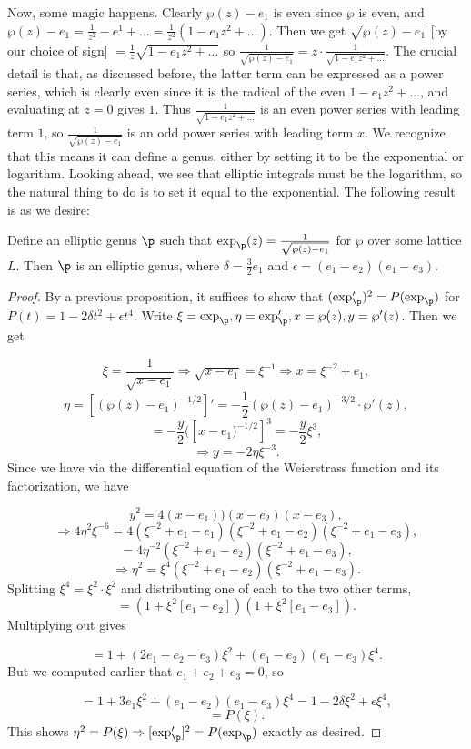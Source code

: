 Now, some magic happens. Clearly $\wp(z) - e_1$ is even since $\wp$ is even, and $\wp(z) - e_1 = \frac{1}{z^2} - e^1 + \dots = \frac{1}{z^2} (1 - e_1 z^2 + \dots)$. Then we get $\sqrt{\wp(z) - e_1}$ [by our choice of sign] $= \frac{1}{z} \sqrt{1 - e_1 z^2 + \dots}$ so $\frac{1}{\sqrt{\wp(z) - e_1}} = z \cdot \frac{1}{\sqrt{1 - e_1 z^2 + \dots}}$.  The crucial detail is that, as discussed before, the latter term can be expressed as a power series, which is clearly even since it is the radical of the even $1 - e_1 z^2 + \dots$, and evaluating at $z = 0$ gives $1$. Thus $\frac{1}{\sqrt{1 - e_1 z^2 + \dots}}$ is an even power series with leading term $1$, so  $\frac{1}{\sqrt{\wp(z) - e_1}}$ is an odd power series with leading term $x$. We recognize that this means it can define a genus, either by setting it to be the exponential or logarithm. Looking ahead, we see that elliptic integrals must be the logarithm, so the natural thing to do is to set it equal to the exponential. The following result is as we desire:

\begin{theorem}
    Define an elliptic genus $\p$ such that $\exp_\p(z) = \frac{1}{\sqrt{\wp(z) - e_1}} $ for $\wp$ over some lattice $L$. Then $\p$ is an elliptic genus, where $\delta = \frac{3}{2} e_1$ and $\epsilon = (e_1 - e_2) (e_1 - e_3)$.
\end{theorem}

\begin{proof}
    By a previous proposition, it suffices to show that $(\exp_\p ')^2 = P(\exp_\p)$ for $P(t) = 1 - 2 \delta t^2 + \epsilon t^4 $. Write $\xi  = \exp_\p, \eta = \exp_\p', x = \wp(z), y = \wp'(z)$. Then we get


\[ \xi = \frac{1}{\sqrt{x - e_1}} \Rightarrow \sqrt{x - e_1} =  \xi^{-1} \Rightarrow x = \xi^{-2} + e_1, \]
\[\eta = [(\wp(z) - e_1)^{-1/2}]' =  -\frac{1}{2} (\wp(z) - e_1)^{-3/2} \cdot \wp'(z),\]
\[  = -\frac{y}{2} ([x-e_1)^{-1/2}]^3 = - \frac{y}{2} \xi^3,\]
\[\Rightarrow y = -2 \eta \xi^{-3}.\]
Since we have via the differential equation of the Weierstrass function and its factorization, we have

\[y^2 = 4(x - e_1))(x - e_2)(x - e_3),\]
\[ \Rightarrow 4 \eta^2 \xi^{-6} = 4 (\xi^{-2} + e_1 - e_1)(\xi^{-2} + e_1 - e_2) (\xi^{-2} + e_1 - e_3),\]
\[ = 4 \eta^{-2} (\xi^{-2} + e_1 - e_2) (\xi^{-2} + e_1 - e_3), \]
\[\Rightarrow \eta^2 = \xi^4 (\xi^{-2} + e_1 - e_2) (\xi^{-2} + e_1 - e_3). \]
Splitting $\xi^4 = \xi^2 \cdot \xi^2$ and distributing one of each to the two other terms, 
\[ = (1 + \xi^2 [e_1 - e_2] ) (1 + \xi^2 [e_1 - e_3]).\]
Multiplying out gives

\[ = 1 + (2 e_1 - e_2 - e_3) \xi^2 + (e_1  -e_2)(e_1 - e_3) \xi^4.\]
But we computed earlier that $e_1 + e_2 + e_3 = 0$, so

\[ = 1 + 3 e_1 \xi^2 + (e_1 - e_2)(e_1 - e_3) \xi^4 = 1 - 2 \delta \xi^2 + \epsilon \xi^4,\]
\[ = P(\xi).\]
This shows $\eta^2  = P(\xi) \Rightarrow [\exp_\p']^2 = P(\exp_\p)$ exactly as desired.
\end{proof}


